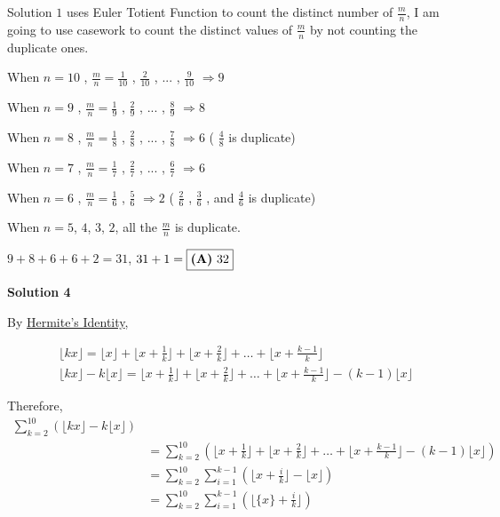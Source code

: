 \begin{enumerate}
 Solution $1$ uses Euler Totient Function to count the distinct number of $\frac{m}{n}$, I am going to use casework to count the distinct values of $\frac{m}{n}$ by not counting the duplicate ones.

 When $n=10$ , $\frac{m}{n}=\frac{1}{10}$ , $\frac{2}{10}$ , $...$ , $\frac{9}{10}$ $\Longrightarrow 9$

 When $n=9$ , $\frac{m}{n}=\frac{1}{9}$ , $\frac{2}{9}$ , $...$ , $\frac{8}{9}$ $\Longrightarrow 8$

 When $n=8$ , $\frac{m}{n}=\frac{1}{8}$ , $\frac{2}{8}$ , $...$ , $\frac{7}{8}$ $\Longrightarrow 6$ (   $\frac{4}{8}$ is duplicate)

 When $n=7$ , $\frac{m}{n}=\frac{1}{7}$ , $\frac{2}{7}$ , $...$ , $\frac{6}{7}$ $\Longrightarrow 6$

 When $n=6$ , $\frac{m}{n}=\frac{1}{6}$ , $\frac{5}{6}$ $\Longrightarrow 2$ (   $\frac{2}{6}$ , $\frac{3}{6}$ , and $\frac{4}{6}$ is duplicate)

 When $n=5$, $4$, $3$, $2$, all the $\frac{m}{n}$ is duplicate.

 $9+8+6+6+2=31$, $31+1=\fbox{\textbf{(A)}\ 32}$




\textbf{Solution 4}

By \href{https://en.wikipedia.org/wiki/Hermite\%27s\_identity}{Hermite's Identity},

 
 \begin{align*} & \lfloor kx \rfloor = \lfloor x \rfloor + \lfloor x + \frac1k \rfloor + \lfloor x + \frac2k \rfloor + \dots + \lfloor x + \frac{k-1}{k} \rfloor\\ & \lfloor kx \rfloor -k \lfloor x \rfloor = \lfloor x + \frac1k \rfloor + \lfloor x + \frac2k \rfloor + \dots + \lfloor x + \frac{k-1}{k} \rfloor - (k-1) \lfloor x \rfloor \end{align*}


 Therefore, 
 \begin{align*} \sum_{k=2}^{10}(\lfloor kx \rfloor -k \lfloor x \rfloor) & \\ &= \sum_{k=2}^{10}(\lfloor x + \frac1k \rfloor + \lfloor x + \frac2k \rfloor + \dots + \lfloor x + \frac{k-1}{k} \rfloor - (k-1) \lfloor x \rfloor)\\ &= \sum_{k=2}^{10}\sum_{i=1}^{k-1}( \lfloor x + \frac{i}{k} \rfloor - \lfloor x \rfloor)\\ &= \sum_{k=2}^{10}\sum_{i=1}^{k-1}( \lfloor \{ x \} + \frac{i}{k} \rfloor) \end{align*}


\end{enumerate}
